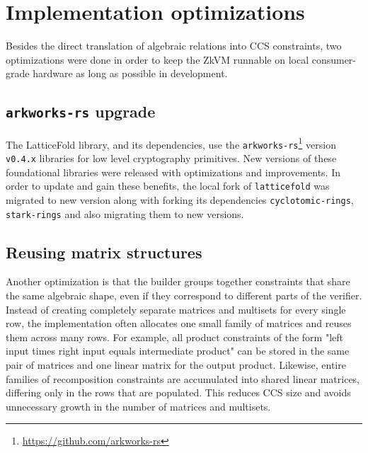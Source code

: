 \section{Implementation optimizations}

Besides the direct translation of algebraic relations into CCS constraints,
two optimizations were done in order to keep the ZkVM runnable on local
consumer-grade hardware as long as possible in development.

\subsection{\texttt{arkworks-rs} upgrade}

The LatticeFold library, and its dependencies, use the \texttt{arkworks-rs}\footnote{\url{https://github.com/arkworks-rs}}
version \texttt{v0.4.x} libraries for low level cryptography primitives. New versions
of these foundational libraries were released with optimizations and improvements.
In order to update and gain these benefits, the local fork of \texttt{latticefold}
was migrated to new version along with forking its dependencies
\texttt{cyclotomic-rings}, \texttt{stark-rings} and also migrating them to new versions.

\subsection{Reusing matrix structures}

Another optimization is that the builder groups together constraints
that share the same algebraic shape, even if they correspond to different parts
of the verifier. Instead of creating completely separate matrices and multisets
for every single row, the implementation often allocates one small family of
matrices and reuses them across many rows. For example, all product constraints
of the form "left input times right input equals intermediate product" can be
stored in the same pair of matrices and one linear
matrix for the output product. Likewise, entire families of recomposition
constraints are accumulated into shared linear matrices, differing only in the
rows that are populated. This reduces CCS size and avoids unnecessary growth in
the number of matrices and multisets.
